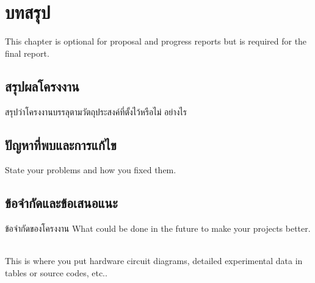 \documentclass[12pt,oneside,openright,a4paper]{cpe-thai-project}
\begin{document}
\chapter{บทสรุป}

This chapter is optional for proposal and progress reports but 
is required for the final report.

\section{สรุปผลโครงงาน}
สรุปว่าโครงงานบรรลุตามวัตถุประสงค์ที่ตั้งไว้หรือไม่ อย่างไร 

\section{ปัญหาที่พบและการแก้ไข}
State your problems and how you fixed them.

\section{ข้อจำกัดและข้อเสนอแนะ}
ข้อจำกัดของโครงงาน What could be done in the future to make your projects better.



\makeatletter
\g@addto@macro{\UrlBreaks}{\UrlOrds}
\makeatother




 \\

This is where you put hardware circuit diagrams, detailed experimental data in tables or source codes, etc.. \\ \bigskip
\end{document}
